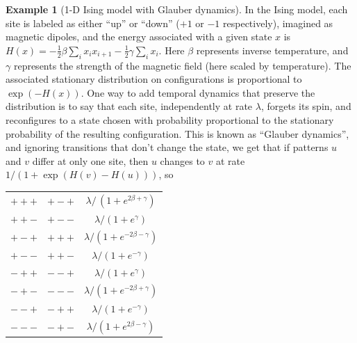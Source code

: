 \documentclass{article}
\theoremstyle{plain}
\theoremstyle{definition}
\newtheorem{example}{Example}[section]
\begin{document}
\begin{example}[1-D Ising model with Glauber dynamics]
  In the Ising model, each site is labeled as either ``up'' or ``down'' ($+1$ or $-1$ respectively),
  imagined as magnetic dipoles,
  and the energy associated with a given state $x$ is $H(x) = - \frac{1}{2} \beta \sum_i x_i x_{i+1} - \frac{1}{2} \gamma \sum_i x_i$.
  Here $\beta$ represents inverse temperature, and $\gamma$ represents the strength of the magnetic field (here scaled by temperature).
  The associated stationary distribution on configurations is proportional to $\exp(-H(x))$.
  One way to add temporal dynamics that preserve the distribution
  is to say that each site, independently at rate $\lambda$,
  forgets its spin,
  and reconfigures to a state chosen with probability proportional to the stationary probability of the resulting configuration.
  This is known as ``Glauber dynamics'', and ignoring transitions that don't change the state,
  we get that if patterns $u$ and $v$ differ at only one site, then $u$ changes to $v$ at rate $1/(1+\exp(H(v)-H(u)))$, so

  \begin{center}
    \begin{tabular}{c@{\quad$\to$\quad}c@{\quad at rate\quad }c}
      $+++$  &   $+-+$   &  $\lambda/\,(1+e^{2\beta + \gamma})$ \\
      $++-$  &   $+--$   &  $\lambda/(1+e^{\gamma})$ \\
      $+-+$  &   $+++$   &  $\lambda/(1+e^{-2\beta - \gamma})$ \\
      $+--$  &   $++-$   &  $\lambda/(1+e^{-\gamma})$ \\
      $-++$  &   $--+$   &  $\lambda/(1+e^{\gamma})$ \\
      $-+-$  &   $---$   &  $\lambda/(1+e^{-2\beta + \gamma})$ \\
      $--+$  &   $-++$   &  $\lambda/(1+e^{-\gamma})$ \\
      $---$  &   $-+-$   &  $\lambda/(1+e^{2\beta - \gamma})$
    \end{tabular}
  \end{center}

\end{example}
\end{document}

